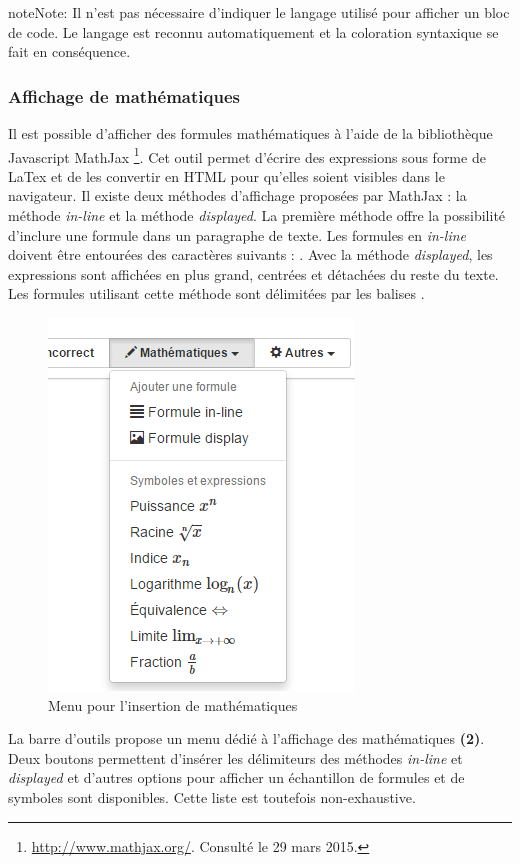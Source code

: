 \documentclass[a4,10pt,french]{sphinxmanual}
\begin{document}
\begin{notice}{note}{Note:}
Il n'est pas nécessaire d'indiquer le langage utilisé pour afficher un bloc de code. Le langage est reconnu automatiquement
et la coloration syntaxique se fait en conséquence.
\end{notice}


\subsubsection{Affichage de mathématiques}
\label{doc-user:affichage-de-mathematiques}
Il est possible d'afficher des formules mathématiques à l'aide de la bibliothèque Javascript MathJax \footnote{
\href{http://www.mathjax.org/}{http://www.mathjax.org/}. Consulté le 29 mars 2015.
}. Cet outil permet d'écrire des expressions sous forme de LaTex et de les convertir en HTML pour qu'elles soient visibles dans le navigateur. Il existe deux méthodes d'affichage proposées par MathJax : la méthode \emph{in-line} et la méthode \emph{displayed}. La première méthode offre la possibilité d'inclure une formule dans un paragraphe de texte. Les formules en \emph{in-line} doivent être entourées des caractères suivants : . Avec la méthode \emph{displayed}, les expressions sont affichées en plus grand, centrées et détachées du reste du texte. Les formules utilisant cette méthode sont délimitées par les balises .
\begin{figure}[htbp]
\centering
\capstart

\includegraphics[width=0.400\linewidth]{math-menu.png}
\caption{Menu pour l'insertion de mathématiques}\end{figure}

La barre d'outils propose un menu dédié à l'affichage des mathématiques \textbf{(2)}. Deux boutons permettent d'insérer les délimiteurs des méthodes \emph{in-line} et \emph{displayed} et d'autres options pour afficher un échantillon de formules et de symboles sont disponibles. Cette liste est toutefois non-exhaustive.
\end{document}
